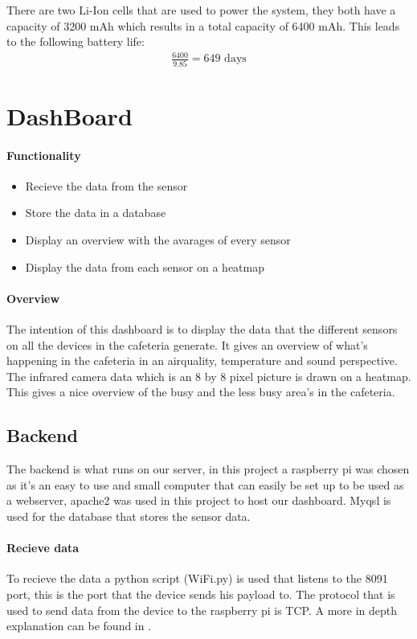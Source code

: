 \documentclass[11pt,a4paper]{article}
\begin{document}
There are two Li-Ion cells that are used to power the system, they both have a capacity of 3200 mAh which results in a total capacity of 6400 mAh. This leads to the following battery life:
\begin{gather*}
	\frac{6400}{9.85}=649 \text{ days}
\end{gather*}


\section{DashBoard}
\paragraph{Functionality}
\begin{itemize}
	\item Recieve the data from the sensor
	\item Store the data in a database
	\item Display an overview with the avarages of every sensor
	\item Display the data from each sensor on a heatmap
\end{itemize}

\paragraph{Overview}
The intention of this dashboard is to display the data that the different sensors on all the devices in the cafeteria generate.
It gives an overview of what's happening in the cafeteria in an airquality, temperature and sound perspective. 
The infrared camera data which is an 8 by 8 pixel picture is drawn on a heatmap. 
This gives a nice overview of the busy and the less busy area's in the cafeteria.  

\subsection{Backend}
The backend is what runs on our server, in this project a raspberry pi was chosen as it's an easy to use and small computer
 that can easily be set up to be used as a webserver, apache2 was used in this project to host our dashboard. Myqsl is used for the database that stores the sensor data.

\paragraph{Recieve data}
To recieve the data a python script (WiFi.py) is used that listens to the 8091 port, this is the port that the device sends his payload to.
The protocol that is used to send data from the device to the raspberry pi is TCP. A more in depth explanation can be found in .
\end{document}
